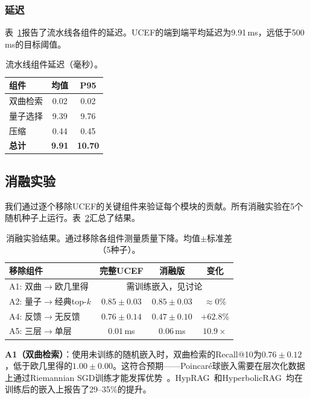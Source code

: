 \documentclass[a4paper,11pt]{ctexart}
\newcommand{\ucef}{\textsf{UCEF}}
\begin{document}
\subsubsection{延迟}

表~\ref{tab:latency}报告了流水线各组件的延迟。\ucef{}的端到端平均延迟为9.91\,ms，远低于500\,ms的目标阈值。

\begin{table}[t]
\centering
\caption{流水线组件延迟（毫秒）。}
\label{tab:latency}
\small
\begin{tabular}{@{}lcc@{}}
\toprule
组件 & 均值 & P95 \\
\midrule
双曲检索 & 0.02 & 0.02 \\
量子选择 & 9.39 & 9.76 \\
压缩     & 0.44 & 0.45 \\
\textbf{总计} & \textbf{9.91} & \textbf{10.70} \\
\bottomrule
\end{tabular}
\end{table}

\subsection{消融实验}

我们通过逐个移除\ucef{}的关键组件来验证每个模块的贡献。所有消融实验在5个随机种子上运行。表~\ref{tab:ablation}汇总了结果。

\begin{table}[t]
\centering
\caption{消融实验结果。通过移除各组件测量质量下降。均值$\pm$标准差（5种子）。}
\label{tab:ablation}
\small
\begin{tabular}{@{}lccc@{}}
\toprule
移除组件 & 完整\ucef{} & 消融版 & 变化 \\
\midrule
A1: 双曲$\to$欧几里得 & \multicolumn{3}{c}{需训练嵌入，见讨论} \\
A2: 量子$\to$经典top-$k$ & $0.85\pm0.03$ & $0.85\pm0.03$ & $\approx0\%$ \\
A4: 反馈$\to$无反馈 & $0.76\pm0.14$ & $0.47\pm0.10$ & $\mathbf{+62.8\%}$ \\
A5: 三层$\to$单层 & $0.01$\,ms & $0.06$\,ms & $\mathbf{10.9\times}$ \\
\bottomrule
\end{tabular}
\end{table}

\textbf{A1（双曲检索）}：使用未训练的随机嵌入时，双曲检索的Recall@10为$0.76\pm0.12$，低于欧几里得的$1.00\pm0.00$。这符合预期——Poincar\'{e}球嵌入需要在层次化数据上通过Riemannian SGD训练才能发挥优势~\cite{nickel2017poincare}。HypRAG~\cite{madhu2026hyprag}和HyperbolicRAG~\cite{cao2025hyperbolicrag}均在训练后的嵌入上报告了29--35\%的提升。
\end{document}
